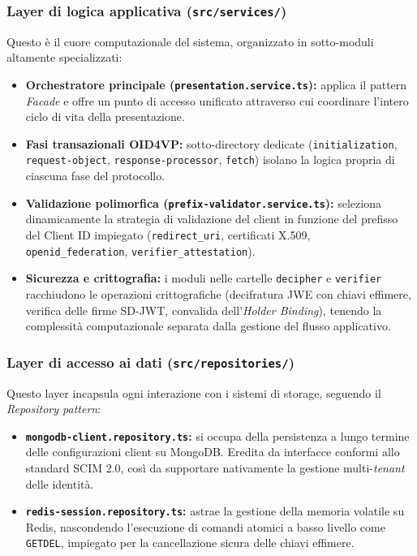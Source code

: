 \subsubsection{Layer di logica applicativa (\texttt{src/services/})}
Questo è il cuore computazionale del sistema, organizzato in sotto-moduli altamente specializzati:
\begin{itemize}
    \item \textbf{Orchestratore principale (\texttt{presentation.service.ts}):} applica il pattern \textit{Facade} e offre un punto di accesso unificato attraverso cui coordinare l'intero ciclo di vita della presentazione.
    \item \textbf{Fasi transazionali OID4VP:} sotto-directory dedicate (\texttt{initialization}, \texttt{request-\allowbreak{}object}, \texttt{response-\allowbreak{}processor}, \texttt{fetch}) isolano la logica propria di ciascuna fase del protocollo.
    \item \textbf{Validazione polimorfica (\texttt{prefix-\allowbreak{}validator.service.ts}):} seleziona dinamicamente la strategia di validazione del client in funzione del prefisso del Client ID impiegato (\texttt{redirect\_\allowbreak{}uri}, certificati X.509, \texttt{openid\_\allowbreak{}federation}, \texttt{verifier\_\allowbreak{}attestation}).
    \item \textbf{Sicurezza e crittografia:} i moduli nelle cartelle \texttt{decipher} e \texttt{verifier} racchiudono le operazioni crittografiche (decifratura JWE con chiavi effimere, verifica delle firme SD-JWT, convalida dell'\textit{Holder Binding}), tenendo la complessità computazionale separata dalla gestione del flusso applicativo.
\end{itemize}

\subsubsection{Layer di accesso ai dati (\texttt{src/repositories/})}
Questo layer incapsula ogni interazione con i sistemi di storage, seguendo il \textit{Repository pattern}:
\begin{itemize}
    \item \textbf{\texttt{mongodb-\allowbreak{}client.repository.ts}:} si occupa della persistenza a lungo termine delle configurazioni client su MongoDB. Eredita da interfacce conformi allo standard SCIM 2.0, così da supportare nativamente la gestione multi-\textit{tenant} delle identità.
    \item \textbf{\texttt{redis-\allowbreak{}session.repository.ts}:} astrae la gestione della memoria volatile su Redis, nascondendo l'esecuzione di comandi atomici a basso livello come \texttt{GETDEL}, impiegato per la cancellazione sicura delle chiavi effimere.
\end{itemize}


